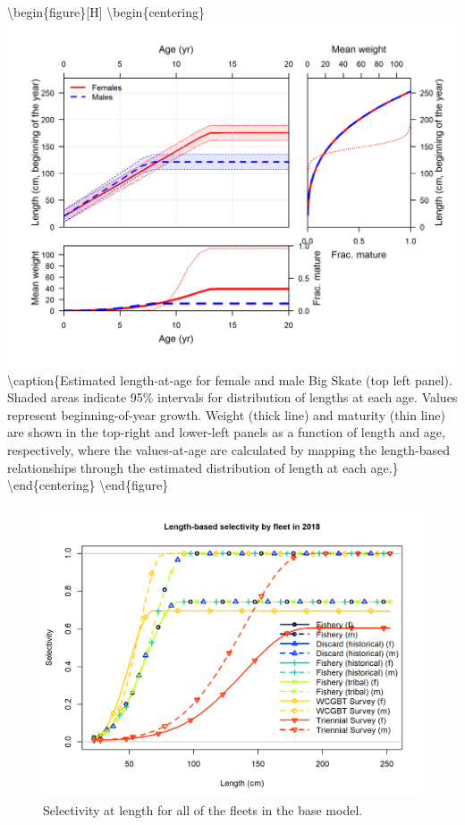 \documentclass[12pt,]{article}
\begin{document}
\textbackslash{}begin\{figure\}{[}H{]}
\textbackslash{}begin\{centering\}
\includegraphics{r4ss/plots_mod1/bio3_sizeatage_plus_WT_and_MAT.png}
\textbackslash{}caption\{Estimated length-at-age for female and male Big
Skate (top left panel). Shaded areas indicate 95\% intervals for
distribution of lengths at each age. Values represent beginning-of-year
growth. Weight (thick line) and maturity (thin line) are shown in the
top-right and lower-left panels as a function of length and age,
respectively, where the values-at-age are calculated by mapping the
length-based relationships through the estimated distribution of length
at each age.\}\label{fig:growth} \textbackslash{}end\{centering\}
\textbackslash{}end\{figure\}

\newpage

\FloatBarrier

\begin{figure}
\centering
\includegraphics{r4ss/plots_mod1/sel01_multiple_fleets_length1.png}
\caption{Selectivity at length for all of the fleets in the base model.
\label{fig:sel01_multiple_fleets_length1}}
\end{figure}
\end{document}
